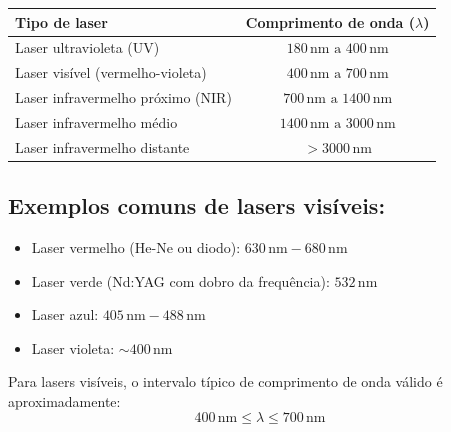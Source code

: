 \begin{center}
\begin{tabular}{|l|c|}
\hline
\textbf{Tipo de laser} & \textbf{Comprimento de onda (\( \lambda \))} \\
\hline
Laser ultravioleta (UV) & \(180\,\mathrm{nm} \text{ a } 400\,\mathrm{nm}\) \\
\hline
Laser visível (vermelho-violeta) & \(400\,\mathrm{nm} \text{ a } 700\,\mathrm{nm}\) \\
\hline
Laser infravermelho próximo (NIR) & \(700\,\mathrm{nm} \text{ a } 1400\,\mathrm{nm}\) \\
\hline
Laser infravermelho médio & \(1400\,\mathrm{nm} \text{ a } 3000\,\mathrm{nm}\) \\
\hline
Laser infravermelho distante & \(>3000\,\mathrm{nm}\) \\
\hline
\end{tabular}
\end{center}

\vspace{0.5cm}

\subsection*{Exemplos comuns de lasers visíveis:}
\begin{itemize}
    \item Laser vermelho (He-Ne ou diodo): \(630\,\mathrm{nm} - 680\,\mathrm{nm}\)
    \item Laser verde (Nd:YAG com dobro da frequência): \(532\,\mathrm{nm}\)
    \item Laser azul: \(405\,\mathrm{nm} - 488\,\mathrm{nm}\)
    \item Laser violeta: \( \sim 400\,\mathrm{nm} \)
\end{itemize}

\vspace{0.5cm}

Para lasers visíveis, o intervalo típico de comprimento de onda válido é aproximadamente:
\[
\boxed{400\,\mathrm{nm} \leq \lambda \leq 700\,\mathrm{nm}}
\]

